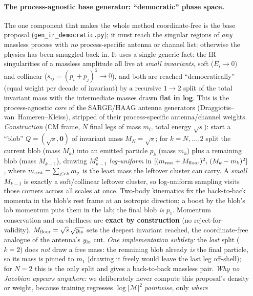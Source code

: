 \documentclass[11pt]{article}
\newcommand{\code}[1]{\texttt{#1}}
\begin{document}
\paragraph{The process-agnostic base generator: ``democratic'' phase space.} The one component that
makes the whole method coordinate-free is the base proposal (\code{gen\_ir\_democratic.py}); it must
reach the singular regions of \emph{any} massless process with \emph{no} process-specific antenna or
channel list; otherwise the physics has been smuggled back in. It uses a single generic fact: the
IR singularities of a massless amplitude all live at \emph{small invariants}, soft ($E_i\!\to\!0$)
and collinear ($s_{ij}=(p_i+p_j)^2\!\to\!0$), and both are reached ``democratically'' (equal weight
per decade of invariant) by a recursive $1\!\to\!2$ split of the total invariant mass with the
intermediate masses drawn \textbf{flat in log}. This is the process-agnostic \emph{core} of the
SARGE/HAAG antenna generators (Draggiotis--van~Hameren--Kleiss), stripped of their process-specific
antenna/channel weights. \emph{Construction} (CM frame, $N$ final legs of mass $m_i$, total energy
$\sqrt s$): start a ``blob'' $Q=(\sqrt s,\mathbf 0)$ of invariant mass $M_N=\sqrt s$; for $k=N,\dots,2$
split the current blob (mass $M_k$) into an emitted particle $p_k$ (mass $m_k$) plus a remaining blob
(mass $M_{k-1}$), drawing $M_{k-1}^2$ \emph{log-uniform} in $[(m_{\rm rest}+M_{\rm floor})^2,\,
(M_k-m_k)^2]$, where $m_{\rm rest}=\sum_{j>k} m_j$ is the least mass the leftover cluster can carry.
A \emph{small} $M_{k-1}$ is exactly a soft/collinear leftover cluster, so log-uniform sampling visits
those corners across all scales at once. Two-body kinematics fix the back-to-back momenta in the
blob's rest frame at an isotropic direction; a boost by the blob's lab momentum puts them in the lab;
the final blob \emph{is} $p_1$. Momentum conservation and on-shellness are \textbf{exact by
construction} (no reject-for-validity). $M_{\rm floor}=\sqrt s\,\sqrt{y_{\rm lo}}$ sets the deepest
invariant reached, the coordinate-free analogue of the antenna's $y_{\rm lo}$ cut. \emph{One
implementation subtlety:} the \emph{last} split ($k{=}2$) does \emph{not} draw a free mass: the
remaining blob already \emph{is} the final particle, so its mass is pinned to $m_1$ (drawing it freely
would leave the last leg off-shell); for $N{=}2$ this is the only split and gives a back-to-back
massless pair. \emph{Why no Jacobian appears anywhere:} we deliberately never compute this proposal's
density or weight, because training regresses $\log|\mathcal M|^2$ \emph{pointwise}, only \emph{where}
\end{document}
